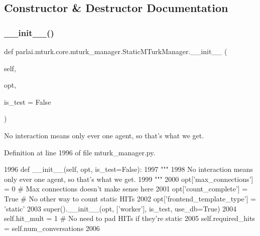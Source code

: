 \subsection{Constructor \& Destructor Documentation}
\mbox{\label{classparlai_1_1mturk_1_1core_1_1mturk__manager_1_1StaticMTurkManager_ab5bd9c520d5aefcb52031fb8c0d2f4bc}} 
\subsubsection{\texorpdfstring{\+\_\+\+\_\+init\+\_\+\+\_\+()}{\_\_init\_\_()}}
{\footnotesize\ttfamily def parlai.\+mturk.\+core.\+mturk\+\_\+manager.\+Static\+M\+Turk\+Manager.\+\_\+\+\_\+init\+\_\+\+\_\+ (\begin{DoxyParamCaption}\item[{}]{self,  }\item[{}]{opt,  }\item[{}]{is\+\_\+test = {\ttfamily False} }\end{DoxyParamCaption})}

\begin{DoxyVerb}No interaction means only ever one agent, so that's what we get.
\end{DoxyVerb}
 

Definition at line 1996 of file mturk\+\_\+manager.\+py.


\begin{DoxyCode}
1996     \textcolor{keyword}{def }\_\_init\_\_(self, opt, is\_test=False):
1997         \textcolor{stringliteral}{"""}
1998 \textcolor{stringliteral}{        No interaction means only ever one agent, so that's what we get.}
1999 \textcolor{stringliteral}{        """}
2000         opt[\textcolor{stringliteral}{'max\_connections'}] = 0  \textcolor{comment}{# Max connections doesn't make sense here}
2001         opt[\textcolor{stringliteral}{'count\_complete'}] = \textcolor{keyword}{True}  \textcolor{comment}{# No other way to count static HITs}
2002         opt[\textcolor{stringliteral}{'frontend\_template\_type'}] = \textcolor{stringliteral}{'static'}
2003         super().\_\_init\_\_(opt, [\textcolor{stringliteral}{'worker'}], is\_test, use\_db=\textcolor{keyword}{True})
2004         self.hit\_mult = 1  \textcolor{comment}{# No need to pad HITs if they're static}
2005         self.required\_hits = self.num\_conversations
2006 
\end{DoxyCode}


